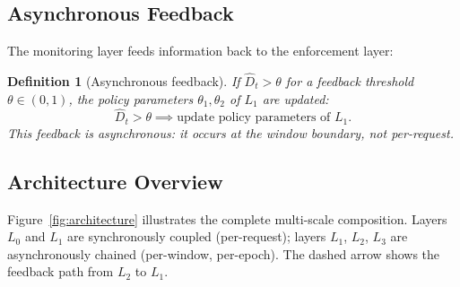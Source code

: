 \documentclass[11pt]{article}
\newtheorem{definition}[theorem]{Definition}
\newcommand{\Dhat}{\widehat{D}}
\newcommand{\Layer}[1]{L_{#1}}
\begin{document}
\subsection{Asynchronous Feedback}

The monitoring layer feeds information back to the enforcement layer:

\begin{definition}[Asynchronous feedback]
\label{def:feedback}
If $\Dhat_t > \theta$ for a feedback threshold $\theta \in (0,1)$, the
policy parameters $\theta_1, \theta_2$ of $\Layer{1}$ are updated:
\[
  \Dhat_t > \theta \implies \text{update policy parameters of } \Layer{1}.
\]
This feedback is asynchronous: it occurs at the window boundary, not
per-request.
\end{definition}

\subsection{Architecture Overview}

Figure~\ref{fig:architecture} illustrates the complete multi-scale
composition. Layers $\Layer{0}$ and $\Layer{1}$ are synchronously coupled
(per-request); layers $\Layer{1}$, $\Layer{2}$, $\Layer{3}$ are
asynchronously chained (per-window, per-epoch). The dashed arrow shows the
feedback path from $\Layer{2}$ to $\Layer{1}$.
\end{document}
